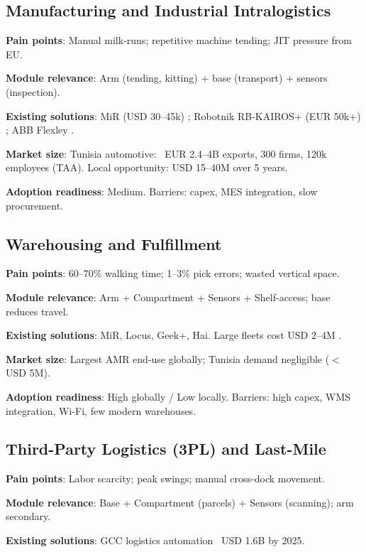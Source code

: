\subsection{Manufacturing and Industrial Intralogistics}

\textbf{Pain points}: Manual milk-runs; repetitive machine tending; JIT pressure from EU.

\textbf{Module relevance}: Arm (tending, kitting) + base (transport) + sensors (inspection).

\textbf{Existing solutions}: MiR (USD 30--45k) \cite{mir250}; Robotnik RB-KAIROS+ (EUR 50k+) \cite{robotnik_kairos}; ABB Flexley \cite{mordor_commercial_security}.

\textbf{Market size}: Tunisia automotive: ~EUR 2.4--4B exports, 300 firms, 120k employees (TAA). Local opportunity: USD 15--40M over 5 years.

\textbf{Adoption readiness}: Medium. Barriers: capex, MES integration, slow procurement.

\subsection{Warehousing and Fulfillment}

\textbf{Pain points}: 60--70\% walking time; 1--3\% pick errors; wasted vertical space.

\textbf{Module relevance}: Arm + Compartment + Sensors + Shelf-access; base reduces travel.

\textbf{Existing solutions}: MiR, Locus, Geek+, Hai. Large fleets cost USD 2--4M \cite{standardbots_amr,fdatabot_amr2026}.

\textbf{Market size}: Largest AMR end-use globally; Tunisia demand negligible ($<$ USD 5M).

\textbf{Adoption readiness}: High globally / Low locally. Barriers: high capex, WMS integration, Wi-Fi, few modern warehouses.

\subsection{Third-Party Logistics (3PL) and Last-Mile}

\textbf{Pain points}: Labor scarcity; peak swings; manual cross-dock movement.

\textbf{Module relevance}: Base + Compartment (parcels) + Sensors (scanning); arm secondary.

\textbf{Existing solutions}: GCC logistics automation ~USD 1.6B by 2025.

